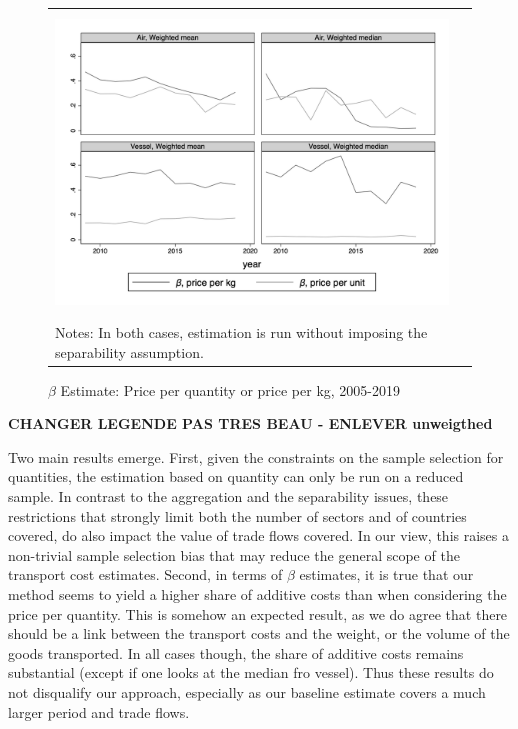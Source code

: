\documentclass[11pt,twoside, authoryear]{elsarticle}
\begin{document}
\begin{figure}[htbp]
	\caption{$\beta$ Estimate: Price per quantity or price per kg, 2005-2019}
\label{fig:beta_comp_wgt_qty}
	\begin{center}
\begin{tabular}{cc}
	\includegraphics[height=8cm]{../scatter_chronology_non_separe_wgt_non_separe_qy.png}\\
\multicolumn{2}{l}{{\footnotesize Notes: In both cases, estimation is run without imposing the separability assumption.}}
\end{tabular}
	\end{center}
\end{figure}

\textbf{CHANGER LEGENDE PAS TRES BEAU - ENLEVER unweigthed}


Two main results emerge. First, given the constraints on the sample selection for quantities, the estimation based on quantity can only be run on a reduced sample. In contrast to the aggregation and the separability issues, these restrictions that strongly limit both the number of sectors and of countries covered, do also impact the value of trade flows covered. In our view, this raises a non-trivial sample selection bias that may reduce the general scope of the transport cost estimates. Second, in terms of $\beta$ estimates, it is true that our method seems to yield a higher share of additive costs than when considering the price per quantity. This is somehow an expected result, as we do agree that there should be a link between the transport costs and the weight, or the volume of the goods transported. In all cases though, the share of additive costs remains substantial (except if one looks at the median fro vessel). Thus these results do not disqualify our approach, especially as our baseline estimate covers a much larger period and trade flows.\smallskip
\end{document}
